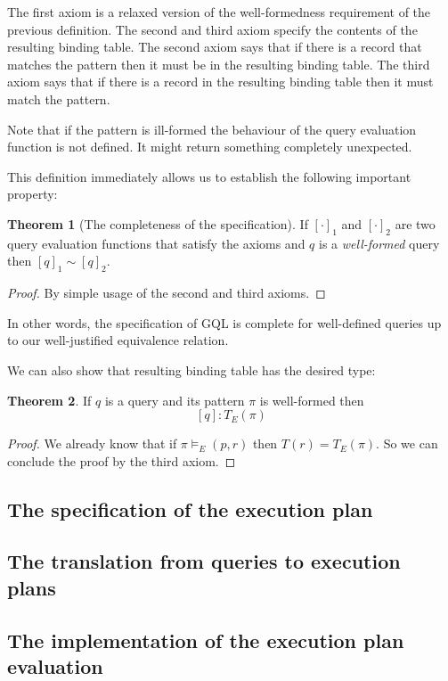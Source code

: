\documentclass[14pt]{constructor-thesis}
\theoremstyle{definition}
\newtheorem*{theorem}{Theorem}
\begin{document}
The first axiom is a relaxed version of the well-formedness requirement of the previous definition. The second and third axiom specify the contents of the resulting binding table. The second axiom says that if there is a record that matches the pattern then it must be in the resulting binding table. The third axiom says that if there is a record in the resulting binding table then it must match the pattern.

Note that if the pattern is ill-formed the behaviour of the query evaluation function is not defined. It might return something completely unexpected.

This definition immediately allows us to establish the following important property:
\begin{theorem}[The completeness of the specification]
  If $[\cdot]_1$ and $[\cdot]_2$ are two query evaluation functions that satisfy the axioms and $q$ is a \textit{well-formed} query then $[q]_1 \sim [q]_2$.
\end{theorem}
\begin{proof}
  By simple usage of the second and third axioms.
\end{proof}

In other words, the specification of GQL is complete for well-defined queries up to our well-justified equivalence relation.

We can also show that resulting binding table has the desired type:
\begin{theorem}
  If $q$ is a query and its pattern $\pi$ is well-formed then
  $$[q] : T_E(\pi)$$
\end{theorem}
\begin{proof}
  We already know that if $\pi \models_E (p, r)$ then $T(r) = T_E(\pi)$. So we can conclude the proof by the third axiom.
\end{proof}

\subsection{The specification of the execution plan}

\subsection{The translation from queries to execution plans}

\subsection{The implementation of the execution plan evaluation}
\end{document}
